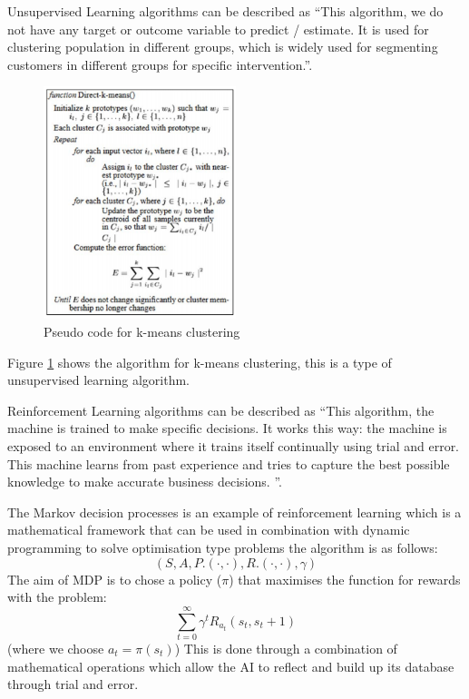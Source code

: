 \documentclass[10pt,a4paper]{scrartcl}
\begin{document}
\begin{multicols}{2}
		 Unsupervised Learning algorithms can be described as ``This algorithm, we do not have any target or outcome variable to predict / estimate.  It is used for clustering population in different groups, which is widely used for segmenting customers in different groups for specific intervention.''\cite{EssentialMachineLearningAlgorithms}.
\begin{figure}[H]
	\begin{center}
	\includegraphics[width=0.5\textwidth,inner] {pseudoCodeKCluster.png}
	\caption{Pseudo code for k-means clustering \cite{MachineLearningAlgorithmsReview}}
	\label{KMeansClusteringPseudoCode}
	\end{center}
\end{figure}		 

Figure \ref{KMeansClusteringPseudoCode} shows the algorithm for k-means clustering, this is a type of unsupervised learning algorithm.

		  Reinforcement Learning algorithms can be described as ``This algorithm, the machine is trained to make specific decisions. It works this way: the machine is exposed to an environment where it trains itself continually using trial and error. This machine learns from past experience and tries to capture the best possible knowledge to make accurate business decisions. ''\cite{EssentialMachineLearningAlgorithms}.
		  
The Markov decision processes is an example of reinforcement learning which is a mathematical framework that can be used in combination with dynamic programming to solve optimisation type problems the algorithm is as follows:
$$
(S, A, P.(\cdot,\cdot), R.(\cdot , \cdot), \gamma) 
$$
The aim of MDP is to chose a policy ($\pi$) that maximises the function for rewards with the problem:
$$
\sum_{t=0}^{\infty} \gamma^{t}R_{a_{t}}(s_{t},s_{t}+1) 
$$
(where we choose $a_{t} = \pi(s_{t})$) \cite{MDP}
This is done through a combination of mathematical operations which allow the AI to reflect and build up its database through trial and error.


\end{multicols}
\end{document}
